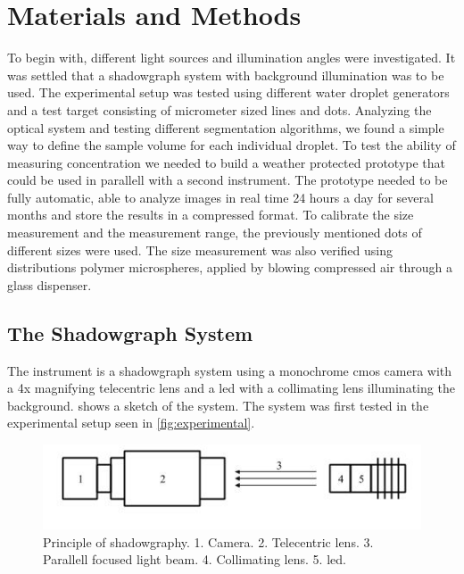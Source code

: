
\chapter{Materials and Methods}
\label{chap:methods}

To begin with, different light sources and illumination angles were investigated. It was settled that a shadowgraph system with background illumination was to be used. The experimental setup was tested using different water droplet generators and a test target consisting of micrometer sized lines and dots. Analyzing the optical system and testing different segmentation algorithms, we found a simple way to define the sample volume for each individual droplet. To test the ability of measuring concentration we needed to build a weather protected prototype that could be used in parallell with a second instrument. The prototype needed to be fully automatic, able to analyze images in real time 24 hours a day for several months and store the results in a compressed format. To calibrate the size measurement and the measurement range, the previously mentioned dots of different sizes were used. The size measurement was also verified using distributions polymer microspheres, applied by blowing compressed air through a glass dispenser.

\section{The Shadowgraph System}

The instrument is a shadowgraph system using a monochrome \gls{cmos} camera with a 4x magnifying telecentric lens and a \gls{led} with a collimating lens illuminating the background.  shows a sketch of the system. The system was first tested in the experimental setup seen in \cref{fig:experimental}. 

\begin{figure}[ht]
\centering\includegraphics[width=0.75\linewidth]{./figures/shadowprinc.jpg}
\caption{Principle of shadowgraphy. 1. Camera. 2. Telecentric lens. 3. Parallell focused light beam. 4. Collimating lens. 5. \gls{led}.}
\label{fig:shadowprinc}
\end{figure}

